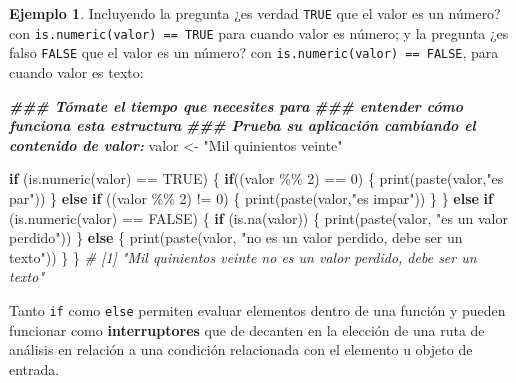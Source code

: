 \documentclass[
]{article}
\newenvironment{Shaded}{\begin{snugshade}}{\end{snugshade}}
\newcommand{\CommentTok}[1]{\textcolor[rgb]{0.56,0.35,0.01}{\textit{#1}}}
\newcommand{\ConstantTok}[1]{\textcolor[rgb]{0.00,0.00,0.00}{#1}}
\newcommand{\ControlFlowTok}[1]{\textcolor[rgb]{0.13,0.29,0.53}{\textbf{#1}}}
\newcommand{\DecValTok}[1]{\textcolor[rgb]{0.00,0.00,0.81}{#1}}
\newcommand{\DocumentationTok}[1]{\textcolor[rgb]{0.56,0.35,0.01}{\textbf{\textit{#1}}}}
\newcommand{\FunctionTok}[1]{\textcolor[rgb]{0.00,0.00,0.00}{#1}}
\newcommand{\NormalTok}[1]{#1}
\newcommand{\OtherTok}[1]{\textcolor[rgb]{0.56,0.35,0.01}{#1}}
\newcommand{\SpecialCharTok}[1]{\textcolor[rgb]{0.00,0.00,0.00}{#1}}
\newcommand{\StringTok}[1]{\textcolor[rgb]{0.31,0.60,0.02}{#1}}
\theoremstyle{definition}
\theoremstyle{definition}
\newtheorem{example}{Ejemplo}[section]
\theoremstyle{definition}
\theoremstyle{definition}
\theoremstyle{remark}
\begin{document}
\begin{example}
Incluyendo la pregunta ¿es verdad \texttt{TRUE} que el valor es un número? con \texttt{is.numeric(valor)\ ==\ TRUE} para cuando valor es número; y la pregunta ¿es falso \texttt{FALSE} que el valor es un número? con \texttt{is.numeric(valor)\ ==\ FALSE}, para cuando valor es texto:

\begin{Shaded}
\begin{Highlighting}[]
\DocumentationTok{\#\#\# Tómate el tiempo que necesites para }
\DocumentationTok{\#\#\# entender cómo funciona esta estructura}
\DocumentationTok{\#\#\# Prueba su aplicación cambiando el contenido de valor:}
\NormalTok{valor }\OtherTok{\textless{}{-}} \StringTok{"Mil quinientos veinte"}

\ControlFlowTok{if}\NormalTok{ (}\FunctionTok{is.numeric}\NormalTok{(valor) }\SpecialCharTok{==} \ConstantTok{TRUE}\NormalTok{) \{}
  \ControlFlowTok{if}\NormalTok{((valor }\SpecialCharTok{\%\%} \DecValTok{2}\NormalTok{) }\SpecialCharTok{==} \DecValTok{0}\NormalTok{) \{}
    \FunctionTok{print}\NormalTok{(}\FunctionTok{paste}\NormalTok{(valor,}\StringTok{"es par"}\NormalTok{))}
\NormalTok{    \} }\ControlFlowTok{else} \ControlFlowTok{if}\NormalTok{ ((valor }\SpecialCharTok{\%\%} \DecValTok{2}\NormalTok{) }\SpecialCharTok{!=} \DecValTok{0}\NormalTok{) \{}
      \FunctionTok{print}\NormalTok{(}\FunctionTok{paste}\NormalTok{(valor,}\StringTok{"es impar"}\NormalTok{))}
\NormalTok{      \}}
\NormalTok{  \} }\ControlFlowTok{else} \ControlFlowTok{if}\NormalTok{ (}\FunctionTok{is.numeric}\NormalTok{(valor) }\SpecialCharTok{==} \ConstantTok{FALSE}\NormalTok{) \{}
    \ControlFlowTok{if}\NormalTok{ (}\FunctionTok{is.na}\NormalTok{(valor)) \{}
      \FunctionTok{print}\NormalTok{(}\FunctionTok{paste}\NormalTok{(valor, }\StringTok{"es un valor perdido"}\NormalTok{))}
\NormalTok{      \} }\ControlFlowTok{else}\NormalTok{ \{}
        \FunctionTok{print}\NormalTok{(}\FunctionTok{paste}\NormalTok{(valor, }\StringTok{"no es un valor perdido, debe ser un texto"}\NormalTok{))}
\NormalTok{      \}}
\NormalTok{    \}}
\CommentTok{\# [1] "Mil quinientos veinte no es un valor perdido, debe ser un texto"}
\end{Highlighting}
\end{Shaded}

\end{example}

\begin{rmdnote}
Tanto \texttt{if} como \texttt{else} permiten evaluar elementos dentro de una función y pueden funcionar como \textbf{interruptores} que de decanten en la elección de una ruta de análisis en relación a una condición relacionada con el elemento u objeto de entrada.
\end{rmdnote}
\end{document}
